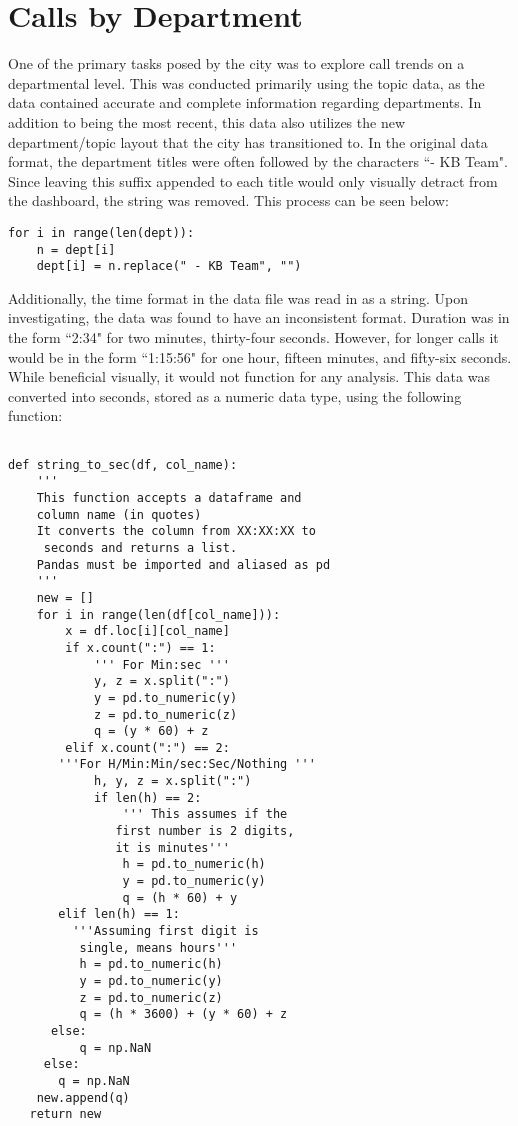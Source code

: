 \documentclass[11pt,twocolumn]{article}
\begin{document}
\section{Calls by Department}
One of the primary tasks posed by the city was to explore call trends on a departmental level.  This was conducted primarily using the topic data, as the data contained accurate and complete information regarding departments.  In addition to being the most recent, this data also utilizes the new department/topic layout that the city has transitioned to.  In the original data format, the department titles were often followed by the characters ``- KB Team".  Since leaving this suffix appended to each title would only visually detract from the dashboard, the string was removed.  This process can be seen below:\\

  \begin{Verbatim}[fontsize=\small]
  for i in range(len(dept)):
    n = dept[i]
    dept[i] = n.replace(" - KB Team", "")
  \end{Verbatim}


Additionally, the time format in the data file was read in as a string.  Upon investigating, the data was found to have an inconsistent format.  Duration was in the form ``2:34" for two minutes, thirty-four seconds.  However, for longer calls it would be in the form ``1:15:56" for one hour, fifteen minutes, and fifty-six seconds.  While beneficial visually, it would not function for any analysis.  This data was converted into seconds, stored as a numeric data type, using the following function:

  \begin{Verbatim}[fontsize=\small]
  
def string_to_sec(df, col_name):
    ''' 
    This function accepts a dataframe and 
    column name (in quotes)
    It converts the column from XX:XX:XX to
     seconds and returns a list.
    Pandas must be imported and aliased as pd
    '''
    new = []
    for i in range(len(df[col_name])):
        x = df.loc[i][col_name]
        if x.count(":") == 1:
            ''' For Min:sec '''
            y, z = x.split(":")
            y = pd.to_numeric(y)
            z = pd.to_numeric(z)
            q = (y * 60) + z
        elif x.count(":") == 2:
       '''For H/Min:Min/sec:Sec/Nothing '''
            h, y, z = x.split(":")
            if len(h) == 2:
                ''' This assumes if the
               first number is 2 digits,
               it is minutes'''
                h = pd.to_numeric(h)
                y = pd.to_numeric(y)
                q = (h * 60) + y
       elif len(h) == 1:
         '''Assuming first digit is 
          single, means hours'''
          h = pd.to_numeric(h)
          y = pd.to_numeric(y)
          z = pd.to_numeric(z)
          q = (h * 3600) + (y * 60) + z
      else:
          q = np.NaN
     else:
       q = np.NaN
    new.append(q)
   return new
  \end{Verbatim}
\end{document}
